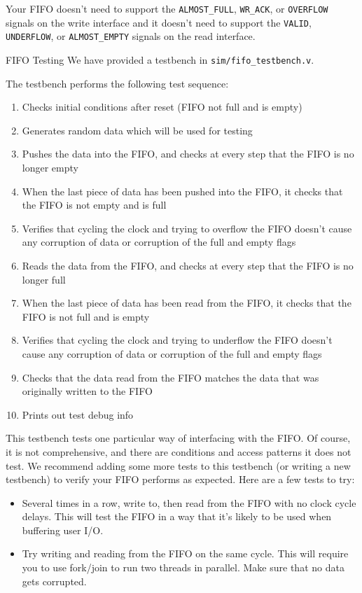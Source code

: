 \documentclass[11pt]{article}
\makeatletter
\renewcommand{\subsection}
{\@startsection {subsection}{1}{0pt}
 {-1ex}
 {0.5ex}
 {\bfseries\normalsize}}
\makeatother
\begin{document}
Your FIFO doesn't need to support the \verb|ALMOST_FULL|, \verb|WR_ACK|, or \verb|OVERFLOW| signals on the write interface and it doesn't need to support the \verb|VALID|, \verb|UNDERFLOW|, or \verb|ALMOST_EMPTY| signals on the read interface.

\subsection{FIFO Testing}
We have provided a testbench in \verb|sim/fifo_testbench.v|.

The testbench performs the following test sequence:
\begin{enumerate}
    \item Checks initial conditions after reset (FIFO not full and is empty)
    \item Generates random data which will be used for testing
    \item Pushes the data into the FIFO, and checks at every step that the FIFO is no longer empty
    \item When the last piece of data has been pushed into the FIFO, it checks that the FIFO is not empty and is full
    \item Verifies that cycling the clock and trying to overflow the FIFO doesn't cause any corruption of data or corruption of the full and empty flags
    \item Reads the data from the FIFO, and checks at every step that the FIFO is no longer full
    \item When the last piece of data has been read from the FIFO, it checks that the FIFO is not full and is empty
    \item Verifies that cycling the clock and trying to underflow the FIFO doesn't cause any corruption of data or corruption of the full and empty flags
    \item Checks that the data read from the FIFO matches the data that was originally written to the FIFO
    \item Prints out test debug info
\end{enumerate}

This testbench tests one particular way of interfacing with the FIFO.
Of course, it is not comprehensive, and there are conditions and access patterns it does not test.
We recommend adding some more tests to this testbench (or writing a new testbench) to verify your FIFO performs as expected. Here are a few tests to try:

\begin{itemize}
    \item Several times in a row, write to, then read from the FIFO with no clock cycle delays.
      This will test the FIFO in a way that it's likely to be used when buffering user I/O.

    \item Try writing and reading from the FIFO on the same cycle.
      This will require you to use fork/join to run two threads in parallel.
      Make sure that no data gets corrupted.
\end{itemize}
\end{document}

